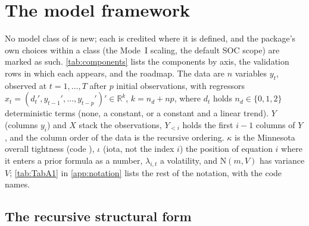 \section{The model framework}\label{sec:framework}\label{sec:framework:notation}\label{sec:framework:delivered}

No model class of  is new; each is credited where it is defined, and the package's
own choices within a class (the Mode~I scaling, the default SOC scope) are marked as such.
\cref{tab:components} lists the components by axis, the validation rows in which each appears,
and the roadmap. %
The data are $n$ variables $y_t$, observed at $t = 1,\dots,T$ after $p$ initial observations, with
regressors $x_t = (d_t', y_{t-1}', \dots, y_{t-p}')' \in \mathbb{R}^k$, $k = n_d + np$, where $d_t$
holds $n_d \in \{0, 1, 2\}$ deterministic terms (none, a constant, or a constant and a linear
trend). %
$Y$ (columns $y_i$) and $X$ stack the observations, $Y_{<i}$ holds the first $i-1$ columns of $Y$,
and the column order of the data is the recursive ordering. %
$\kappa$ is the Minnesota overall tightness (code ), $\iota$ (iota, not the index
$i$) the position of equation $i$ where it enters a prior formula as a number, $\lambda_{i,t}$ a
volatility, and $\mathrm{N}(m, V)$ has variance $V$; \cref{tab:TabA1} in \cref{app:notation}
lists the rest of the notation, with the code names. %

\subsection{The recursive structural form}\label{sec:framework:structural}

